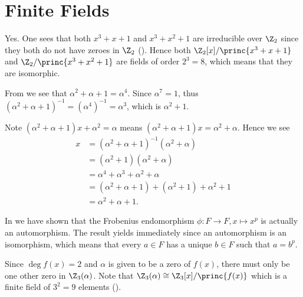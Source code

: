 \section{Finite Fields}
\begin{questions}
    \item Yes. One sees that both $x^3 + x + 1$ and $x^3 + x^2 + 1$ are irreducible over $\Z_2$ since they both do not have zeroes in $\Z_2$ (). Hence both $\Z_2[x]/\princ{x^3+x+1}$ and $\Z_2/\princ{x^3+x^2+1}$ are fields of order $2^3 = 8$, which means that they are isomorphic.
    
    \item \begin{partquestions}{\roman*}
        \item From  we see that $\alpha^2 + \alpha + 1 = \alpha^4$. Since $\alpha^7 = 1$, thus $(\alpha^2 + \alpha + 1)^{-1} = (\alpha^4)^{-1} = \alpha^3$, which is $\alpha^2 + 1$.
        
        \item Note $(\alpha^2 + \alpha + 1)x + \alpha^2 = \alpha$ means $(\alpha^2 + \alpha + 1)x = \alpha^2 + \alpha$. Hence we see
        \begin{align*}
            x &= (\alpha^2+\alpha+1)^{-1}(\alpha^2 + \alpha)\\
            &= (\alpha^2 + 1)(\alpha^2 + \alpha)\\
            &= \alpha^4 + \alpha^3 + \alpha^2 + \alpha\\
            &= (\alpha^2 + \alpha + 1) + (\alpha^2 + 1) + \alpha^2 + 1\\
            &= \alpha^2 + \alpha + 1. 
        \end{align*}
    \end{partquestions}
    
    \item In  we have shown that the Frobenius endomorphism $\phi: F \to F, x \mapsto x^p$ is actually an automorphism. The result yields immediately since an automorphism is an isomorphism, which means that every $a \in F$ has a unique $b \in F$ such that $a = b^p$.
    
    \item Since $\deg f(x) = 2$ and $\alpha$ is given to be a zero of $f(x)$, there must only be one other zero in $\Z_3(\alpha)$. Note that $\Z_3(\alpha) \cong \Z_3[x]/\princ{f(x)}$ which is a finite field of $3^2 = 9$ elements ().
    

\end{questions}
